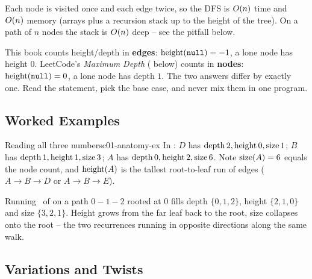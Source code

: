 \begin{complexitybox}
Each node is visited once and each edge twice, so the DFS is $O(n)$ time and
$O(n)$ memory (arrays plus a recursion stack up to the height of the tree). On a
path of $n$ nodes the stack is $O(n)$ deep -- see the pitfall below.
\end{complexitybox}

\begin{notebox}
This book counts height/depth in \textbf{edges}: $\operatorname{height}(\texttt{null})=-1$, a lone node has
height $0$. LeetCode's \emph{Maximum Depth} ( below) counts in
\textbf{nodes}: $\operatorname{height}(\texttt{null})=0$, a lone node has depth $1$. The two answers differ by
exactly one. Read the statement, pick the base case, and never mix them in one program.
\end{notebox}

\subsection{Worked Examples}

\begin{example}{Reading all three numbers}{c01-anatomy-ex}
In : $D$ has $\operatorname{depth} 2, \operatorname{height} 0, \operatorname{size} 1$; $B$ has
$\operatorname{depth} 1, \operatorname{height} 1, \operatorname{size} 3$; $A$ has $\operatorname{depth} 0, \operatorname{height} 2, \operatorname{size} 6$. Note
$\operatorname{size}(A)=6$ equals the node count, and $\operatorname{height}(A)$ is the tallest root-to-leaf run of
edges ($A\to B\to D$ or $A\to B\to E$).
\end{example}

\begin{tracebox}
Running \lstname\ of  on a path $0-1-2$ rooted at $0$ fills
depth $\{0,1,2\}$, height $\{2,1,0\}$ and size $\{3,2,1\}$. Height grows from the far
leaf back to the root, size collapses onto the root -- the two recurrences running in
opposite directions along the same walk.
\end{tracebox}

\subsection{Variations and Twists}

